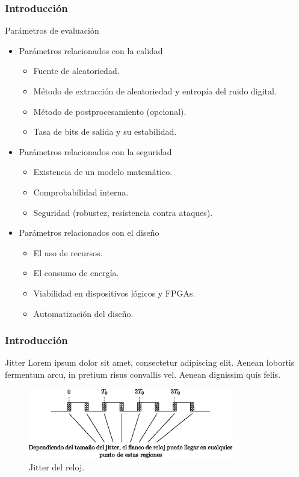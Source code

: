 \documentclass[10pt]{beamer}
\begin{document}
\begin{frame}
    \frametitle{Introducción}
    \begin{block}{Parámetros de evaluación}
        \justifying
		\begin{itemize}
		    \item Parámetros relacionados con la calidad
		        \begin{itemize}
		            \item Fuente de aleatoriedad.
		            \item Método de extracción de aleatoriedad y entropía del ruido digital.
		            \item Método de postprocesamiento (opcional).
		            \item Tasa de bits de salida y su estabilidad.
		        \end{itemize}
		    \item Parámetros relacionados con la seguridad
		        \begin{itemize}
		            \item Existencia de un modelo matemático.
		            \item Comprobabilidad interna.
		            \item Seguridad (robustez, resistencia contra ataques).
		        \end{itemize}
		    \item Parámetros relacionados con el diseño
		        \begin{itemize}
		            \item El uso de recursos.
		            \item El consumo de energía.
		            \item Viabilidad en dispositivos lógicos y FPGAs.
		            \item Automatización del diseño.
		        \end{itemize}
		\end{itemize}   
		\vspace{0.1cm}
	\end{block}
\end{frame}


\begin{frame}
    \frametitle{Introducción}
    \begin{block}{Jitter}
        \justifying
         Lorem ipsum dolor sit amet, consectetur adipiscing elit. Aenean lobortis fermentum arcu, in pretium risus convallis vel. Aenean dignissim quis felis. 
	\end{block}
	\begin{figure}[hbtp]
        \centering
        \includegraphics[width=0.8\textwidth]{F9_jitter}
        \caption{Jitter del reloj.}
        \label{fig:F9_jitter}
    \end{figure}
\end{frame}
\end{document}
